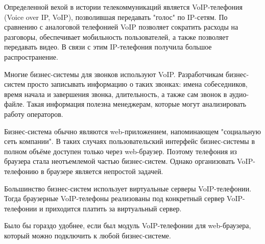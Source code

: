 \intro
Определенной вехой в истории телекоммуникаций является VoIP-телефония (Voice over IP, VoIP), позволившая передавать "голос" по IP-сетям. По сравнению с аналоговой телефонией VoIP позволяет сократить расходы на разговоры, обеспечивает мобильность пользователей, а также позволяет передавать видео. В связи с этим IP-телефония получила большое распространение.

Многие бизнес-системы для звонков используют VoIP. Разработчикам бизнес-систем просто записывать информацию о таких звонках: имена собеседников, время начала и завершения звонка, длительность, а также сам звонок в аудио-файле. Такая информация полезна менеджерам, которые могут анализировать работу операторов.

Бизнес-система обычно являются web-приложением, напоминающем "социальную сеть компании". В таких случаях пользовательский интерфейс бизнес-системы в полном объёме доступен только через web-браузер. Поэтому телефония из браузера стала неотъемлемой частью бизнес-систем. Однако организовать VoIP-телефонию в браузере является непростой задачей.

Большинство бизнес-систем использует виртуальные серверы VoIP-телефонии. Тогда браузерные VoIP-телефоны реализованы под конкретный сервер VoIP-телефонии и приходится платить за виртуальный сервер.

Было бы гораздо удобнее, если был модуль VoIP-телефонии для web-браузера, который можно подключить к любой бизнес-системе.
